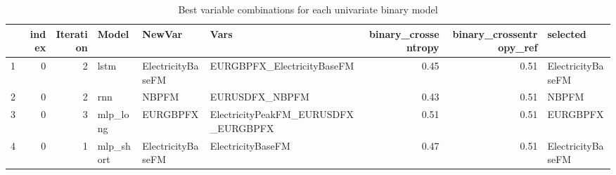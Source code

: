 \begin{table}[ht]
\centering
\begin{tabular}{rrrlllrrl}
  \hline
 & index & Iteration & Model & NewVar & Vars & binary\_crossentropy & binary\_crossentropy\_ref & selected \\ 
  \hline
1 &   0 &   2 & lstm & ElectricityBaseFM & EURGBPFX\_ElectricityBaseFM & 0.45 & 0.51 & ElectricityBaseFM \\ 
  2 &   0 &   2 & rnn & NBPFM & EURUSDFX\_NBPFM & 0.43 & 0.51 & NBPFM \\ 
  3 &   0 &   3 & mlp\_long & EURGBPFX & ElectricityPeakFM\_EURUSDFX\_EURGBPFX & 0.51 & 0.51 & EURGBPFX \\ 
  4 &   0 &   1 & mlp\_short & ElectricityBaseFM & ElectricityBaseFM & 0.47 & 0.51 & ElectricityBaseFM \\ 
   \hline
\end{tabular}
\caption{Best variable combinations for each univariate binary model} 
\label{tab:best_models}
\end{table}

